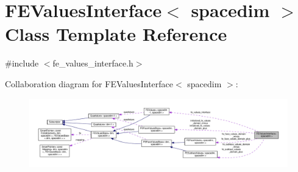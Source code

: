 \hypertarget{class_f_e_values_interface}{}\section{F\+E\+Values\+Interface$<$ spacedim $>$ Class Template Reference}
\label{class_f_e_values_interface}


{\ttfamily \#include $<$fe\+\_\+values\+\_\+interface.\+h$>$}



Collaboration diagram for F\+E\+Values\+Interface$<$ spacedim $>$\+:\nopagebreak
\begin{figure}[H]
\begin{center}
\leavevmode
\includegraphics[width=350pt]{class_f_e_values_interface__coll__graph}
\end{center}
\end{figure}
